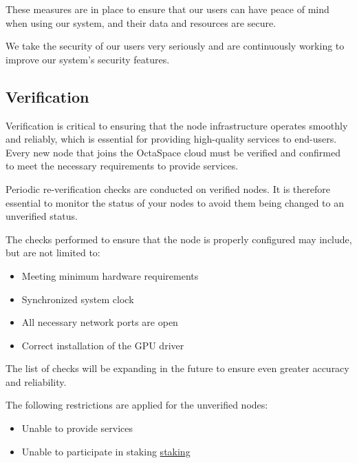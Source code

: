 These measures are in place to ensure that our users can have peace of mind when using our system, and their data and resources are secure.

We take the security of our users very seriously and are continuously working to improve our system's security features.

\subsection{Verification}

Verification is critical to ensuring that the node infrastructure operates smoothly and reliably, which is essential for providing high-quality services to end-users.
Every new node that joins the OctaSpace cloud must be verified and confirmed to meet the necessary requirements to provide services.

Periodic re-verification checks are conducted on verified nodes. It is therefore essential to monitor the status of your nodes to avoid them being changed to an unverified status.

The checks performed to ensure that the node is properly configured may include, but are not limited to:

\begin{itemize}
    \item Meeting minimum hardware requirements
    \item Synchronized system clock
    \item All necessary network ports are open
    \item Correct installation of the GPU driver
\end{itemize}

The list of checks will be expanding in the future to ensure even greater accuracy and reliability.

The following restrictions are applied for the unverified nodes:

\begin{itemize}
    \item Unable to provide services
    \item Unable to participate in staking \hyperref[sec:staking]{staking}
\end{itemize}
